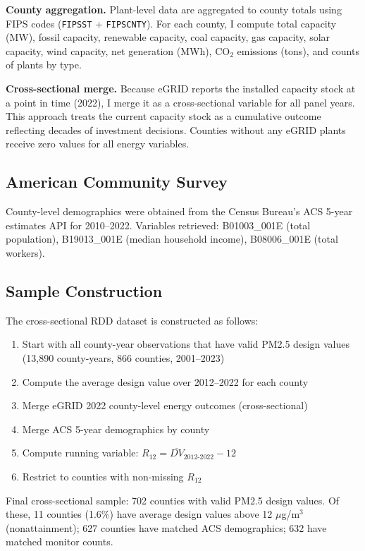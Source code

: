 \documentclass[12pt]{article}
\begin{document}
\textbf{County aggregation.} Plant-level data are aggregated to county totals using FIPS codes (\texttt{FIPSST} + \texttt{FIPSCNTY}). For each county, I compute total capacity (MW), fossil capacity, renewable capacity, coal capacity, gas capacity, solar capacity, wind capacity, net generation (MWh), CO$_2$ emissions (tons), and counts of plants by type.

\textbf{Cross-sectional merge.} Because eGRID reports the installed capacity stock at a point in time (2022), I merge it as a cross-sectional variable for all panel years. This approach treats the current capacity stock as a cumulative outcome reflecting decades of investment decisions. Counties without any eGRID plants receive zero values for all energy variables.

\subsection{American Community Survey}

County-level demographics were obtained from the Census Bureau's ACS 5-year estimates API for 2010--2022. Variables retrieved: B01003\_001E (total population), B19013\_001E (median household income), B08006\_001E (total workers).

\subsection{Sample Construction}

The cross-sectional RDD dataset is constructed as follows:
\begin{enumerate}
    \item Start with all county-year observations that have valid PM2.5 design values (13,890 county-years, 866 counties, 2001--2023)
    \item Compute the average design value over 2012--2022 for each county
    \item Merge eGRID 2022 county-level energy outcomes (cross-sectional)
    \item Merge ACS 5-year demographics by county
    \item Compute running variable: $R_{12} = \overline{DV}_{2012\text{-}2022} - 12$
    \item Restrict to counties with non-missing $R_{12}$
\end{enumerate}

Final cross-sectional sample: 702 counties with valid PM2.5 design values. Of these, 11 counties (1.6\%) have average design values above 12 $\mu$g/m$^3$ (nonattainment); 627 counties have matched ACS demographics; 632 have matched monitor counts.
\end{document}
